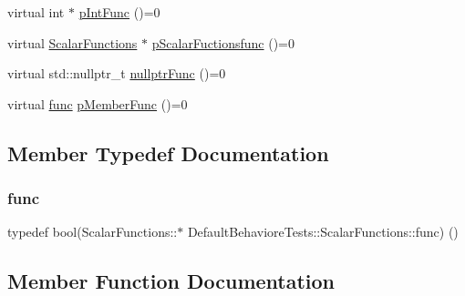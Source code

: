 \begin{DoxyCompactItemize}
\item 
virtual int $\ast$ \mbox{\hyperlink{structDefaultBehavioreTests_1_1ScalarFunctions_aaaa8932cd11168e14f8d1eab4223716d}{p\+Int\+Func}} ()=0
\item 
virtual \mbox{\hyperlink{structDefaultBehavioreTests_1_1ScalarFunctions}{Scalar\+Functions}} $\ast$ \mbox{\hyperlink{structDefaultBehavioreTests_1_1ScalarFunctions_a4275a91beb75a7fea23d58486c2a23bc}{p\+Scalar\+Fuctionsfunc}} ()=0
\item 
virtual std\+::nullptr\+\_\+t \mbox{\hyperlink{structDefaultBehavioreTests_1_1ScalarFunctions_a8c2fe586d77eaf6bc15fe6c05176ed8c}{nullptr\+Func}} ()=0
\item 
virtual \mbox{\hyperlink{structDefaultBehavioreTests_1_1ScalarFunctions_ada3040daa5305ca2e73cba998068027e}{func}} \mbox{\hyperlink{structDefaultBehavioreTests_1_1ScalarFunctions_a1bc6998422558a790b99cc9a4fe87376}{p\+Member\+Func}} ()=0
\end{DoxyCompactItemize}


\subsection{Member Typedef Documentation}
\mbox{\label{structDefaultBehavioreTests_1_1ScalarFunctions_ada3040daa5305ca2e73cba998068027e}} 
\subsubsection{\texorpdfstring{func}{func}}
{\footnotesize\ttfamily typedef bool(Scalar\+Functions\+::$\ast$ Default\+Behaviore\+Tests\+::\+Scalar\+Functions\+::func) ()}



\subsection{Member Function Documentation}
\mbox{\label{structDefaultBehavioreTests_1_1ScalarFunctions_addb29942de86693d6246dc8713e2c489}} 
